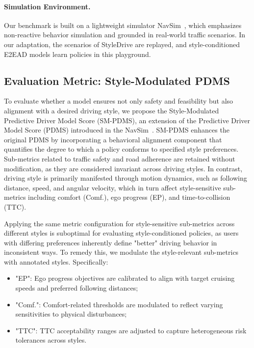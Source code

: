 \documentclass{article}
\begin{document}
\paragraph{Simulation Environment.} 
Our benchmark is built on a lightweight simulator NavSim~\cite{dauner2024navsim}, which emphasizes non-reactive behavior simulation and grounded in real-world traffic scenarios. In our adaptation, the scenarios of StyleDrive are replayed, and style-conditioned E2EAD models learn policies in this playground.

\subsection{Evaluation Metric: Style-Modulated PDMS}

To evaluate whether a model ensures not only safety and feasibility but also alignment with a desired driving style, we propose the Style-Modulated Predictive Driver Model Score (SM-PDMS), an extension of the Predictive Driver Model Score (PDMS) introduced in the NavSim~\cite{dauner2024navsim}. SM-PDMS enhances the original PDMS by incorporating a behavioral alignment component that quantifies the degree to which a policy conforms to specified style preferences. Sub-metrics related to traffic safety and road adherence are retained without modification, as they are considered invariant across driving styles. In contrast, driving style is primarily manifested through motion dynamics, such as following distance, speed, and angular velocity, which in turn affect style-sensitive sub-metrics including comfort (Comf.), ego progress (EP), and time-to-collision (TTC).

Applying the same metric configuration for style-sensitive sub-metrics across different styles is suboptimal for evaluating style-conditioned policies, as users with differing preferences inherently define "better" driving behavior in inconsistent ways. To remedy this, we modulate the style-relevant sub-metrics with annotated styles. Specifically:
\begin{itemize}[leftmargin=1em, topsep=0pt, itemsep=0.5pt]
\item "EP": Ego progress objectives are calibrated to align with target cruising speeds and preferred following distances;
\item "Comf.": Comfort-related thresholds are modulated to reflect varying sensitivities to physical disturbances;
\item "TTC": TTC acceptability ranges are adjusted to capture heterogeneous risk tolerances across styles.
\end{itemize}
\end{document}
